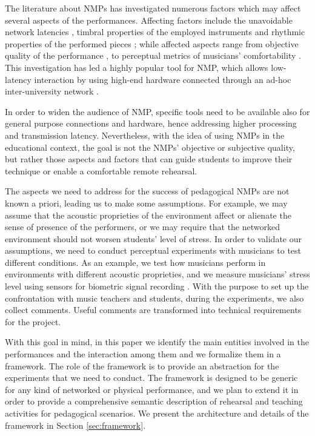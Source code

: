 The literature about NMPs has investigated numerous factors which may affect several aspects of the performances. Affecting factors include the unavoidable network latencies \cite{Chafe1}, timbral properties of the employed instruments \cite{Kolazi2013} and rhythmic properties of the performed pieces \cite{RottondiFeature}; while affected aspects range from objective quality of the performance \cite{Chafe3}, to perceptual metrics of musicians' comfortability \cite{CIM2018}. This investigation has led a highly popular tool for NMP, which allows low-latency interaction by using high-end hardware connected through an ad-hoc inter-university network \cite{drioli2013networked}. 

In order to widen the audience of NMP, %
specific tools need to be available also for general purpose connections and hardware, hence addressing higher processing and transmission latency. Nevertheless, with the idea of using NMPs in the educational context, the goal is not the NMPs' objective or subjective quality, but rather those aspects and factors that can guide students to improve their technique or enable a comfortable remote rehearsal. 

The aspects we need to address for the success of pedagogical NMPs are not known a priori, leading us to make some assumptions. For example, we may assume that the acoustic proprieties of the environment affect or alienate the sense of presence of the performers, or we may require that the networked environment should not worsen students' level of stress. In order to validate our assumptions, we need to conduct perceptual experiments with musicians to test different conditions. As an example, we test how musicians perform in environments with different acoustic proprieties, and we measure musicians' stress level using sensors for biometric signal recording \cite{Yoshie2009}. With the purpose to set up the confrontation with music teachers and students, during the experiments, we also collect comments. Useful comments are transformed into technical requirements for the project. 

With this goal in mind, in this paper we identify the main entities involved in the performances and the interaction among them and we formalize them in a framework. The role of the framework is to provide an abstraction for the experiments that we need to conduct. The framework is designed to be generic for any kind of networked or physical performance, and we plan to extend it in order to provide a comprehensive semantic description of rehearsal and teaching activities for pedagogical scenarios. We present the architecture and details of the framework in Section \ref{sec:framework}.

